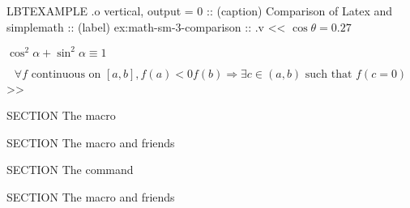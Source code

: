 \begin{lbt}
    LBTEXAMPLE .o vertical, output = 0
    :: (caption) Comparison of Latex and simplemath
    :: (label) ex:math-sm-3-comparison
    :: .v <<
                    $\cos\theta = 0.27$

           $\cos^2\alpha + \sin^2\alpha \equiv 1$

      \[ \forall f \text{ continuous on } [a,b], f(a) < 0 f(b) \Longrightarrow \exists c \in (a,b) \text{ such that } f(c = 0) \]
    >>







    SECTION The  macro

    SECTION The  macro and friends

    SECTION The  command

    SECTION The  macro and friends

\end{lbt}
